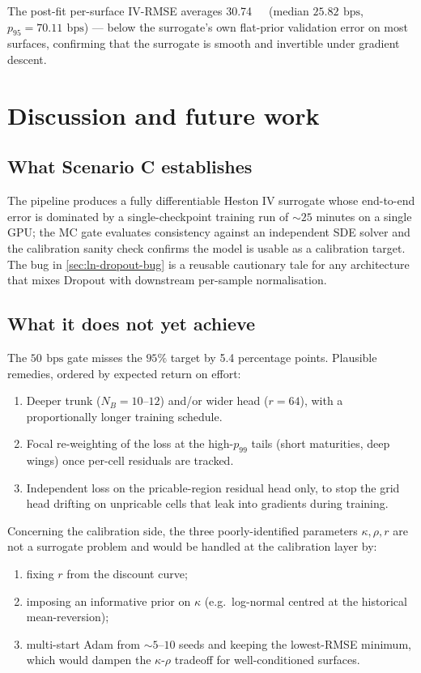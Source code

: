 \documentclass[11pt,a4paper]{article}
\newcommand{\bps}{\,\text{bps}}
\begin{document}
The post-fit per-surface IV-RMSE averages \SI{30.74}{\bps}
(median $\SI{25.82}{\bps}$, $p_{95}=\SI{70.11}{\bps}$) --- below the
surrogate's own flat-prior validation error on most surfaces,
confirming that the surrogate is smooth and invertible under
gradient descent.

\section{Discussion and future work}
\label{sec:discussion}

\subsection{What Scenario C establishes}

The pipeline produces a fully differentiable Heston IV surrogate whose
end-to-end error is dominated by a single-checkpoint training run of
$\sim\!25$ minutes on a single GPU; the MC gate evaluates consistency
against an independent SDE solver and the calibration sanity check
confirms the model is usable as a calibration target. The bug in
\cref{sec:ln-dropout-bug} is a reusable cautionary tale for any
architecture that mixes Dropout with downstream per-sample normalisation.

\subsection{What it does not yet achieve}

The $\SI{50}{\bps}$ gate misses the $95\%$ target by 5.4 percentage
points. Plausible remedies, ordered by expected return on effort:
\begin{enumerate}
  \item Deeper trunk ($N_B=10$--$12$) and/or wider head ($r=64$),
        with a proportionally longer training schedule.
  \item Focal re-weighting of the loss at the high-$p_{99}$ tails
        (short maturities, deep wings) once per-cell residuals are
        tracked.
  \item Independent loss on the pricable-region residual head only, to
        stop the grid head drifting on unpricable cells that leak into
        gradients during training.
\end{enumerate}
Concerning the calibration side, the three poorly-identified parameters
$\kappa,\rho,r$ are not a surrogate problem and would be handled at the
calibration layer by:
\begin{enumerate}
  \item fixing $r$ from the discount curve;
  \item imposing an informative prior on $\kappa$
        (e.g.\ log-normal centred at the historical mean-reversion);
  \item multi-start Adam from $\sim\!5$--$10$ seeds and keeping the
        lowest-RMSE minimum, which would dampen the $\kappa$-$\rho$
        tradeoff for well-conditioned surfaces.
\end{enumerate}
\end{document}
